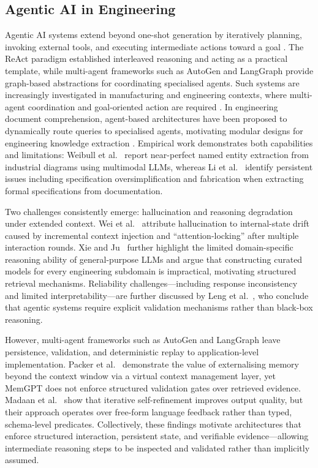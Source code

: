 \documentclass[largeformat]{interact}
\begin{document}
\subsection{Agentic AI in Engineering} 
\label{sec:agentic-ai-engineering} %
Agentic AI systems extend beyond one-shot generation by iteratively planning, invoking external tools, and executing intermediate actions toward a goal \cite{wang2024autonomousagents, prasad2024adapt}. The ReAct paradigm \cite{yao2023reactsynergizingreasoningacting} established interleaved reasoning and acting as a practical template, while multi-agent frameworks such as AutoGen \cite{wu2024autogen} and LangGraph provide graph-based abstractions for coordinating specialised agents. Such systems are increasingly investigated in manufacturing and engineering contexts, where multi-agent coordination and goal-oriented action are required \cite{leng2026, zhao2025}. In engineering document comprehension, agent-based architectures have been proposed to dynamically route queries to specialised agents, motivating modular designs for engineering knowledge extraction \cite{xie2026agentframework}. Empirical work demonstrates both capabilities and limitations: Weibull et al.~\cite{weibull_named_2025} report near-perfect named entity extraction from industrial diagrams using multimodal LLMs, whereas Li et al.~\cite{li2025a} identify persistent issues including specification oversimplification and fabrication when extracting formal specifications from documentation.
 
Two challenges consistently emerge: hallucination and reasoning degradation under extended context. Wei et al.~\cite{wei2026shadows} attribute hallucination to internal-state drift caused by incremental context injection and ``attention-locking'' after multiple interaction rounds. Xie and Ju~\cite{xie2026agentframework} further highlight the limited domain-specific reasoning ability of general-purpose LLMs and argue that constructing curated models for every engineering subdomain is impractical, motivating structured retrieval mechanisms. Reliability challenges---including response inconsistency and limited interpretability---are further discussed by Leng et al.~\cite{leng2026}, who conclude that agentic systems require explicit validation mechanisms rather than black-box reasoning.

However, multi-agent frameworks such as AutoGen and LangGraph leave persistence, validation, and deterministic replay to application-level implementation. Packer et al.~\cite{packer2023memgpt} demonstrate the value of externalising memory beyond the context window via a virtual context management layer, yet MemGPT does not enforce structured validation gates over retrieved evidence. Madaan et al.~\cite{madaan2023selfrefine} show that iterative self-refinement improves output quality, but their approach operates over free-form language feedback rather than typed, schema-level predicates. Collectively, these findings motivate architectures that enforce structured interaction, persistent state, and verifiable evidence---allowing intermediate reasoning steps to be inspected and validated rather than implicitly assumed.
\end{document}
